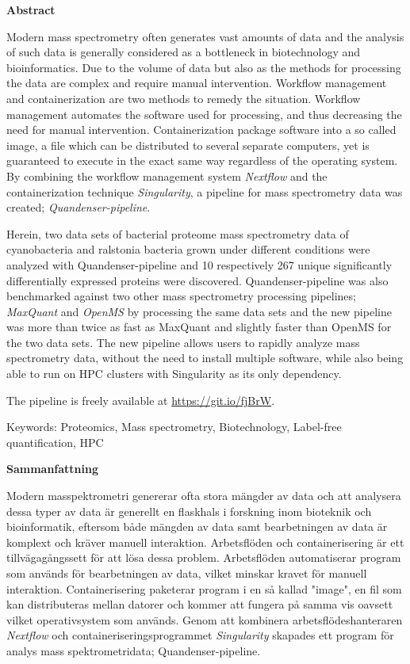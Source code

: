 \begin{center}\normalfont\Large\bfseries\centering Abstract\end{center}
Modern mass spectrometry often generates vast amounts of data and the analysis of such data is generally considered as a bottleneck in biotechnology and bioinformatics. Due to the volume of data but also as the methods for processing the data are complex and require manual intervention. Workflow management and containerization are two methods to remedy the situation. Workflow management automates the software used for processing, and thus decreasing the need for manual intervention. Containerization package software into a so called image, a file which can be distributed to several separate computers, yet is guaranteed to execute in the exact same way regardless of the operating system. By combining the workflow management system \textit{Nextflow} and the containerization technique \textit{Singularity}, a pipeline for mass spectrometry data was created; \textit{Quandenser-pipeline}.

Herein, two data sets of bacterial proteome mass spectrometry data of cyanobacteria and ralstonia bacteria grown under different conditions were analyzed with Quandenser-pipeline and 10 respectively 267 unique significantly differentially expressed proteins were discovered. Quandenser-pipeline was also benchmarked against two other mass spectrometry processing pipelines; \textit{MaxQuant} and \textit{OpenMS} by processing the same data sets and the new pipeline was more than twice as fast as MaxQuant and slightly faster than OpenMS for the two data sets. The new pipeline allows users to rapidly analyze mass spectrometry data, without the need to install multiple software, while also being able to run on HPC clusters with Singularity as its only dependency.

The pipeline is freely available at \url{https://git.io/fjBrW}.

\vspace{2cm}

Keywords: Proteomics, Mass spectrometry, Biotechnology, Label-free quantification, HPC

\newpage

\begin{center}\normalfont\Large\bfseries\centering Sammanfattning\end{center}
Modern masspektrometri genererar ofta stora mängder av data och att analysera dessa typer av data är generellt en flaskhals i forskning inom bioteknik och bioinformatik, eftersom både mängden av data samt bearbetningen av data är komplext och kräver manuell interaktion. Arbetsflöden och containerisering är ett tillvägagångssett för att lösa dessa problem. Arbetsflöden automatiserar program som används för bearbetningen av data, vilket minskar kravet för manuell interaktion. Containerisering paketerar program i en så kallad "image", en fil som kan distributeras mellan datorer och kommer att fungera på samma vis oavsett vilket operativsystem som används. Genom att kombinera arbetsflödeshanteraren \textit{Nextflow} och containeriseringsprogrammet \textit{Singularity} skapades ett program för analys mass spektrometridata; Quandenser-pipeline.

